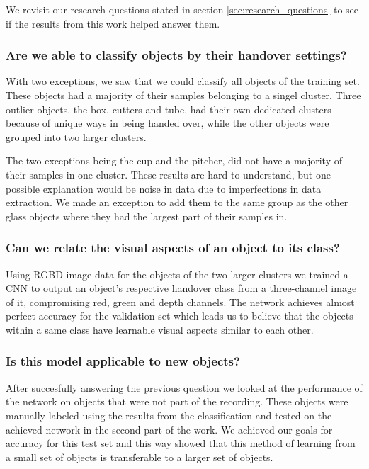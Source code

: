 We revisit our research questions stated in section \ref{sec:research_questions} to see if the results from this work helped answer them.

\subsubsection*{Are we able to classify objects by their handover settings?}

With two exceptions, we saw that we could classify all objects of the training set. These objects had a majority of their samples belonging to a singel cluster. Three outlier objects, the box, cutters and tube, had their own dedicated clusters because of unique ways in being handed over, while the other objects were grouped into two larger clusters.

The two exceptions being the cup and the pitcher, did not have a majority of their samples in one cluster. These results are hard to understand, but one possible explanation would be noise in data due to imperfections in data extraction. We made an exception to add them to the same group as the other glass objects where they had the largest part of their samples in.


\subsubsection*{Can we relate the visual aspects of an object to its class?}

Using RGBD image data for the objects of the two larger clusters we trained a CNN to output an object's respective handover class from a three-channel image of it, compromising red, green and depth channels. The network achieves almost perfect accuracy for the validation set which leads us to believe that the objects within a same class have learnable visual aspects similar to each other.

\subsubsection*{Is this model applicable to new objects?}

After succesfully answering the previous question we looked at the performance of the network on objects that were not part of the recording. These objects were manually labeled using the results from the classification and tested on the achieved network in the second part of the work. We achieved our goals for accuracy for this test set and this way showed that this method of learning from a small set of objects is transferable to a larger set of objects.


